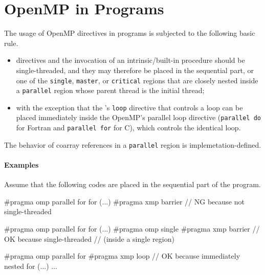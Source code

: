 \chapter{OpenMP in {\XMP} Programs}
\label{chap:openmp}

The usage of OpenMP directives in {\XMP} programs is subjected to
the following basic rule.

\begin{itemize}
 \item {\XMP} directives and the invocation of an {\XMP}
       intrinsic/built-in procedure should be single-threaded, and they
       may therefore be placed in the sequential part, or one of
       the {\tt single}, {\tt master}, or {\tt critical} regions
       that are closely nested inside a {\tt parallel} region whose
       parent thread is the initial thread;

 \item with the exception that the {\XMP}'s {\tt loop} directive that
       controls a loop can be placed immediately inside the OpenMP's
       parallel loop directive ({\tt parallel do} for Fortran and
       {\tt parallel for} for C), which controls the identical loop.
\end{itemize}

The behavior of coarray references in a {\tt parallel} region is
implemetation-defined.

\subsubsection*{Examples}

Assume that the following codes are placed in the sequential part of
the program.

\begin{XCexample}
#pragma omp parallel for 
for (...){
  #pragma xmp barrier  // NG because not single-threaded
}
\end{XCexample}

\begin{XCexample}
#pragma omp parallel for 
for (...){
  #pragma omp single 
  {
    #pragma xmp barrier  // OK because single-threaded
                         // (inside a single region)
  }
}
\end{XCexample}

\begin{XCexample}
#pragma omp parallel for
#pragma xmp loop  // OK because immediately nested
for (...){
  ...
}
\end{XCexample}

